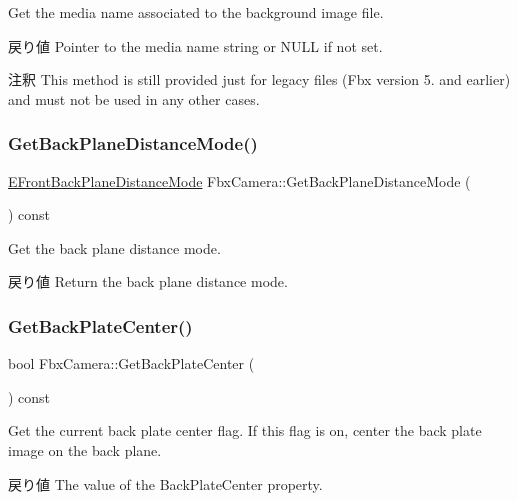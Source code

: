 Get the media name associated to the background image file. \begin{DoxyReturn}{戻り値}
Pointer to the media name string or {\ttfamily N\+U\+LL} if not set. 
\end{DoxyReturn}
\begin{DoxyRemark}{注釈}
This method is still provided just for legacy files (Fbx version 5. and earlier) and must not be used in any other cases. 
\end{DoxyRemark}
\mbox{\label{class_fbx_camera_a862928086a5ae50086651ce6b96aa8c0}} 
\subsubsection{\texorpdfstring{Get\+Back\+Plane\+Distance\+Mode()}{GetBackPlaneDistanceMode()}}
{\footnotesize\ttfamily \hyperlink{class_fbx_camera_a79e74898d117e741c3fbd10b1ef21c79}{E\+Front\+Back\+Plane\+Distance\+Mode} Fbx\+Camera\+::\+Get\+Back\+Plane\+Distance\+Mode (\begin{DoxyParamCaption}{ }\end{DoxyParamCaption}) const}

Get the back plane distance mode. \begin{DoxyReturn}{戻り値}
Return the back plane distance mode. 
\end{DoxyReturn}
\mbox{\label{class_fbx_camera_a9313551dcd023e3b47e29b8a899f1f23}} 
\subsubsection{\texorpdfstring{Get\+Back\+Plate\+Center()}{GetBackPlateCenter()}}
{\footnotesize\ttfamily bool Fbx\+Camera\+::\+Get\+Back\+Plate\+Center (\begin{DoxyParamCaption}{ }\end{DoxyParamCaption}) const}

Get the current back plate center flag. If this flag is on, center the back plate image on the back plane. \begin{DoxyReturn}{戻り値}
The value of the Back\+Plate\+Center property. 
\end{DoxyReturn}
\mbox{\label{class_fbx_camera_a76021d40416efffd5bffcf462741bada}} 
